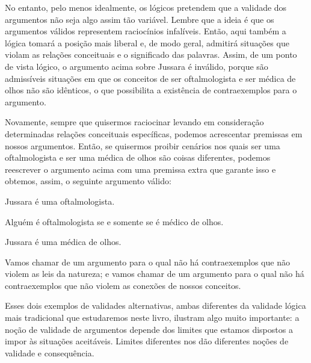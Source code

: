 No entanto, pelo menos idealmente, os lógicos pretendem que a validade dos argumentos não seja algo assim tão variável.
Lembre que a ideia é que os argumentos válidos representem raciocínios infalíveis.
Então, aqui também a lógica tomará a posição mais liberal e, de modo geral, admitirá situações que violam as relações conceituais e o significado das palavras.
Assim, de um ponto de vista lógico, o argumento acima sobre Jussara é inválido, porque são admissíveis situações em que os conceitos de ser oftalmologista e ser médica de olhos não são idênticos, o que possibilita a existência de contraexemplos para o argumento.

Novamente, sempre que quisermos raciocinar levando em consideração determinadas relações conceituais específicas, podemos acrescentar premissas em nossos argumentos.
Então, se quisermos proibir cenários nos quais ser uma oftalmologista e ser uma médica de olhos são coisas diferentes, podemos reescrever o argumento acima com uma premissa extra que garante isso e obtemos, assim, o seguinte argumento válido:

	\begin{earg}
		\item[] Jussara é uma oftalmologista.
		\item[] Alguém é oftalmologista se e somente se é médico de olhos.
		\item[\therefore] Jussara é uma médica de olhos.
	\end{earg}
Vamos chamar de \label{nomoval} um argumento para o qual não há contraexemplos que não violem as leis da natureza; e vamos chamar de  um argumento para o qual não há contraexemplos que não violem as conexões de nossos conceitos.

Esses dois exemplos de validades alternativas, ambas diferentes da validade lógica mais tradicional que estudaremos neste livro, ilustram algo muito importante:
a noção de validade de argumentos depende dos limites que estamos dispostos a impor às situações aceitáveis.
Limites diferentes nos dão diferentes noções de validade e consequência.



